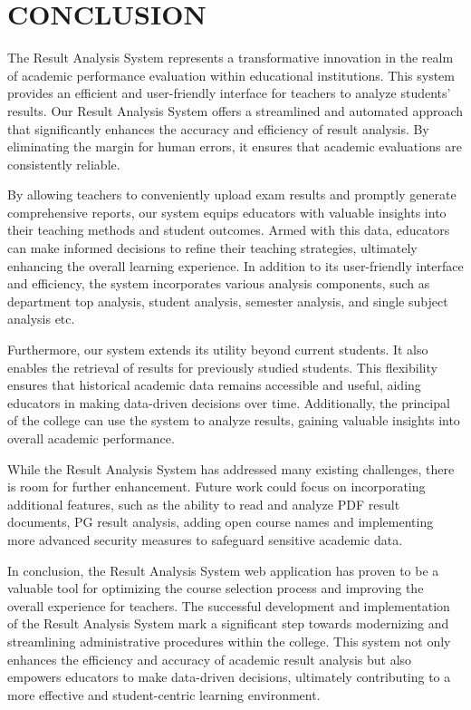 \documentclass{nascproject}
\begin{document}
\chapter{CONCLUSION}

 The Result Analysis System represents a transformative innovation in the realm of academic performance evaluation within educational institutions. This system provides an efficient and user-friendly interface for teachers to analyze students' results. Our Result Analysis System offers a streamlined and automated approach that significantly enhances the accuracy and efficiency of result analysis. By eliminating the margin for human errors, it ensures that academic evaluations are consistently reliable.
 
 By allowing teachers to conveniently upload exam results and promptly generate comprehensive reports, our system equips educators with valuable insights into their teaching methods and student outcomes. Armed with this data, educators can make informed decisions to refine their teaching strategies, ultimately enhancing the overall learning experience. In addition to its user-friendly interface and efficiency, the system incorporates various analysis components, such as department top analysis, student analysis, semester analysis, and single subject analysis etc.
 
 Furthermore, our system extends its utility beyond current students. It also enables the retrieval of results for previously studied students. This flexibility ensures that historical academic data remains accessible and useful, aiding educators in making data-driven decisions over time. Additionally, the principal of the college can use the system to analyze results, gaining valuable insights into overall academic performance.
 
 While the Result Analysis System has addressed many existing challenges, there is room for further enhancement. Future work could focus on incorporating additional features, such as the ability to read and analyze PDF result documents, PG result analysis, adding open course names and implementing more advanced security measures to safeguard sensitive academic data.
 
 In conclusion, the Result Analysis System web application has proven to be a valuable tool for optimizing the course selection process and improving the overall experience for teachers. The successful development and implementation of the Result Analysis System mark a significant step towards modernizing and streamlining administrative procedures within the college. This system not only enhances the efficiency and accuracy of academic result analysis but also empowers educators to make data-driven decisions, ultimately contributing to a more effective and student-centric learning environment.
\end{document}
